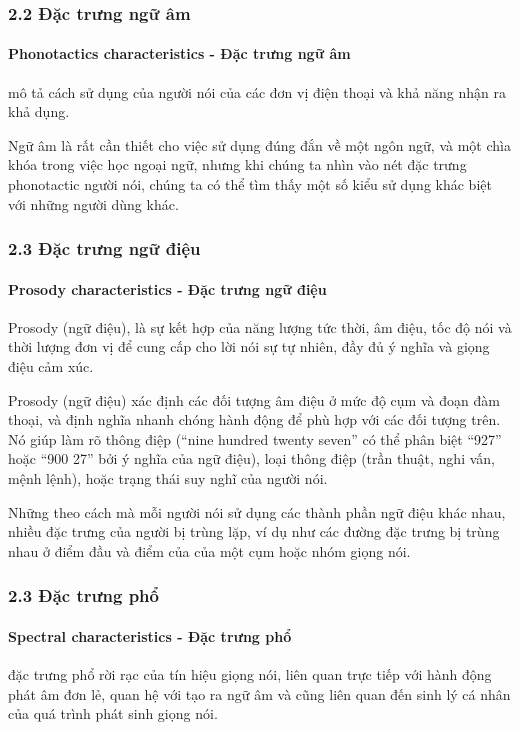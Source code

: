 \documentclass{article}
\begin{document}
	\subsubsection{2.2 Đặc trưng ngữ âm}
	\paragraph{Phonotactics characteristics - Đặc trưng ngữ âm} mô tả cách sử dụng của người nói của các đơn vị điện thoại và khả năng nhận ra khả dụng. 
	
	Ngữ âm là rất cần thiết cho việc sử dụng đúng đắn về một ngôn ngữ, và một chìa khóa trong việc học ngoại ngữ, nhưng khi chúng ta nhìn vào nét đặc trưng phonotactic người nói, chúng ta có thể tìm thấy một số kiểu sử dụng khác biệt với những người dùng khác.
	
	\subsubsection{2.3 Đặc trưng ngữ điệu}
	\paragraph{Prosody characteristics - Đặc trưng ngữ điệu}
	Prosody (ngữ điệu), là sự kết hợp của năng lượng tức thời, âm điệu, tốc độ nói và thời lượng đơn vị để cung cấp cho lời nói sự tự nhiên, đầy đủ ý nghĩa và giọng điệu cảm xúc. 
	
	Prosody (ngữ điệu) xác định các đối tượng âm điệu ở mức độ cụm và đoạn đàm thoại, và định nghĩa nhanh chóng hành động để phù hợp với các đối tượng trên. Nó giúp làm rõ thông điệp (“nine hundred twenty seven”  có thể phân biệt “927” hoặc “900 27” bởi ý nghĩa của ngữ điệu), loại thông điệp (trần thuật, nghi vấn, mệnh lệnh), hoặc trạng thái suy nghĩ của người nói. 
	
	Những theo cách mà mỗi người nói sử dụng các thành phần ngữ điệu khác nhau, nhiều đặc trưng của người bị trùng lặp, ví dụ như các đường đặc trưng bị trùng nhau ở điểm đầu và điểm của của một cụm hoặc nhóm giọng nói.
	
	\subsubsection{2.3 Đặc trưng phổ}
	\paragraph{Spectral characteristics - Đặc trưng phổ}
	 đặc trưng phổ rời rạc của tín hiệu giọng nói, liên quan trực tiếp với hành động phát âm đơn lẻ, quan hệ với tạo ra ngữ âm và cũng liên quan đến sinh lý cá nhân của quá trình phát sinh giọng nói. 
	 
\end{document}
